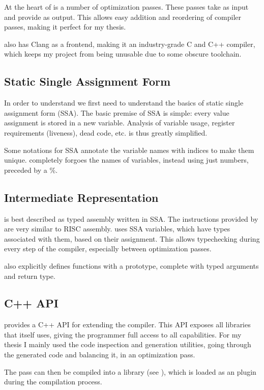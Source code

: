 At the heart of \lc{} is a number of optimization passes.
These passes take \ir{} as input and provide \ir{} as output.
This allows easy addition and reordering of compiler passes, making it perfect for my thesis.

\llvm{} also has Clang as a frontend, making it an industry-grade C and C++ compiler, which keeps my project from being unusable due to some obscure toolchain.

\subsection{Static Single Assignment Form}
\label{ssa}
In order to understand \ir{} we first need to understand the basics of static single assignment form (SSA).
The basic premise of SSA is simple: every value assignment is stored in a new variable.
Analysis of variable usage, register requirements (liveness), dead code, etc. is thus greatly simplified.

Some notations for SSA annotate the variable names with indices to make them unique.
\ir{} completely forgoes the names of variables, instead using just numbers, preceded by a \%.

\subsection{\llvm{} Intermediate Representation}
\label{ir}
\ir{} is best described as typed assembly written in SSA.
The instructions provided by \ir{} are very similar to RISC assembly.
\ir{} uses SSA variables, which have types associated with them, based on their assignment.
This allows typechecking during every step of the compiler, especially between optimization passes.

\ir{} also explicitly defines functions with a prototype, complete with typed arguments and return type.

\subsection{\llvm{} C++ API}
\label{api}
\llvm{} provides a C++ API for extending the compiler.
This API exposes all libraries that \llvm{} itself uses, giving the programmer full access to all capabilities.
For my thesis I mainly used the code inspection and generation utilities, going through the generated \ir{} code and balancing it, in an optimization pass.

The pass can then be compiled into a library (see ), which is loaded as an \llvm{} plugin during the compilation process.

